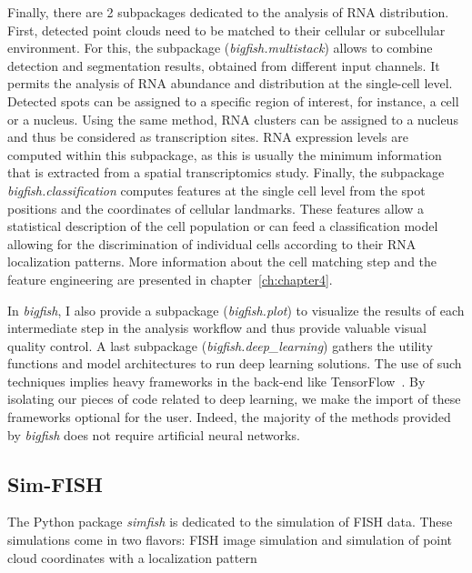 Finally, there are 2 subpackages dedicated to the analysis of \ac{RNA} distribution.
First, detected point clouds need to be matched to their cellular or subcellular environment. For this, the subpackage (\emph{bigfish.multistack}) allows to combine detection and segmentation results, obtained from different input channels.
It permits the analysis of \ac{RNA} abundance and distribution at the single-cell level.
Detected spots can be assigned to a specific region of interest, for instance, a cell or a nucleus.
Using the same method, \ac{RNA} clusters can be assigned to a nucleus and thus be considered as transcription sites.
\ac{RNA} expression levels are computed within this subpackage, as this is usually the minimum information that is extracted from a spatial transcriptomics study.
Finally, the subpackage \emph{bigfish.classification} computes features at the single cell level from the spot positions and the coordinates of cellular landmarks. 
These features allow a statistical description of the cell population or can feed a classification model allowing for the discrimination of individual cells according to their RNA localization patterns.
More information about the cell matching step and the feature engineering are presented in chapter~\ref{ch:chapter4}.

In \emph{bigfish}, I also provide a subpackage (\emph{bigfish.plot}) to visualize the results of each intermediate step in the analysis workflow and thus provide valuable visual quality control.
A last subpackage (\emph{bigfish.deep\_learning}) 
gathers the utility functions and model architectures to run deep learning solutions. 
The use of such techniques implies heavy frameworks in the back-end like TensorFlow~\cite{tensorflow_2015}.
By isolating our pieces of code related to deep learning, we make the import of these frameworks optional for the user.
Indeed, the majority of the methods provided by \emph{bigfish} does not require artificial neural networks.

\subsection{Sim-FISH}
\label{subsec:simfish}

The Python package \emph{simfish} is dedicated to the simulation of FISH data. These simulations come in two flavors: FISH image simulation and simulation of point cloud coordinates with a localization pattern

